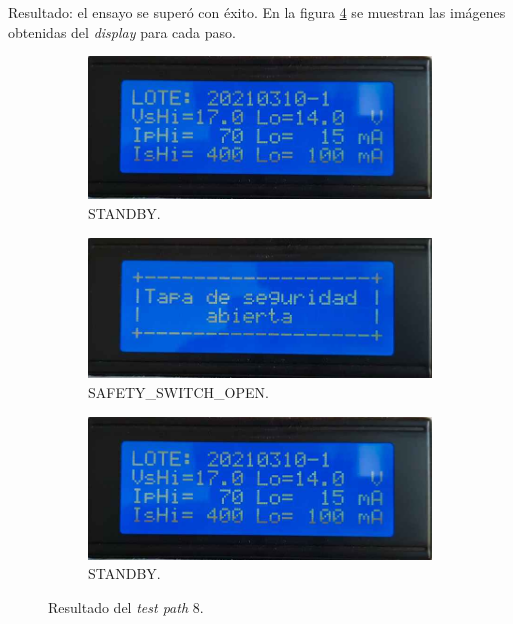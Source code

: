 \pagebreak

Resultado: el ensayo se superó con éxito. En la figura \ref{fig:pruConf_8_res} se muestran las imágenes obtenidas del \textit{display} para cada paso. 

\begin{figure}[!htpb]
     \centering
     \begin{subfigure}[b]{0.4\textwidth}
         \centering
         \includegraphics[width=1.1\textwidth]{./Figures/pru_fail.jpeg}
         \caption{STANDBY.}
         \label{fig:pruConf_8_1}
     \end{subfigure}
           \hfill
     \begin{subfigure}[b]{0.4\textwidth}
         \centering
         \includegraphics[width=1.1\textwidth]{./Figures/tapa_abierta.jpeg}
         \caption{SAFETY\_SWITCH\_OPEN.}
         \label{fig:pruConf_8_2}
     \end{subfigure}
           \hfill
     \begin{subfigure}[b]{0.4\textwidth}
         \centering
         \includegraphics[width=1.1\textwidth]{./Figures/pru_fail.jpeg}
         \caption{STANDBY.}
         \label{fig:pruConf_8_3}
     \end{subfigure}
        \caption{Resultado del \textit{test path} 8.}
        \label{fig:pruConf_8_res}
\end{figure}

